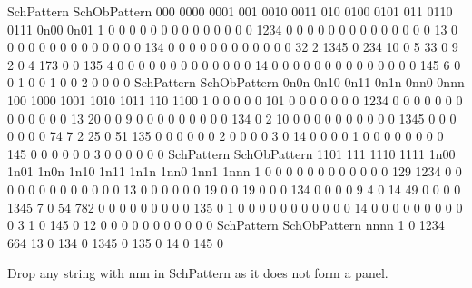 \begin{Schunk}
\begin{Soutput}
            SchPattern
SchObPattern 000 0000 0001 001 0010 0011 010 0100 0101 011 0110 0111 0n00 0n01
        1      0    0    0   0    0    0   0    0    0   0    0    0    0    0
        1234   0    0    0   0    0    0   0    0    0   0    0    0    0    0
        13     0    0    0   0    0    0   0    0    0   0    0    0    0    0
        134    0    0    0   0    0    0   0    0    0   0    0    0   32    2
        1345   0  234   10   0    5   33   0    9    2   0    4  173    0    0
        135    4    0    0   0    0    0   0    0    0   0    0    0    0    0
        14     0    0    0   0    0    0   0    0    0   0    0    0    0    0
        145    6    0    0   1    0    0   1    0    0   2    0    0    0    0
            SchPattern
SchObPattern 0n0n 0n10 0n11 0n1n 0nn0 0nnn 100 1000 1001 1010 1011 110 1100
        1       0    0    0    0    0  101   0    0    0    0    0   0    0
        1234    0    0    0    0    0    0   0    0    0    0    0   0    0
        13     20    0    0    9    0    0   0    0    0    0    0   0    0
        134     0    2   10    0    0    0   0    0    0    0    0   0    0
        1345    0    0    0    0    0    0   0   74    7    2   25   0   51
        135     0    0    0    0    0    0   2    0    0    0    0   3    0
        14      0    0    0    0    1    0   0    0    0    0    0   0    0
        145     0    0    0    0    0    0   3    0    0    0    0   0    0
            SchPattern
SchObPattern 1101 111 1110 1111 1n00 1n01 1n0n 1n10 1n11 1n1n 1nn0 1nn1 1nnn
        1       0   0    0    0    0    0    0    0    0    0    0    0  129
        1234    0   0    0    0    0    0    0    0    0    0    0    0    0
        13      0   0    0    0    0    0   19    0    0   19    0    0    0
        134     0   0    0    0    9    4    0   14   49    0    0    0    0
        1345    7   0   54  782    0    0    0    0    0    0    0    0    0
        135     0   1    0    0    0    0    0    0    0    0    0    0    0
        14      0   0    0    0    0    0    0    0    0    0    3    1    0
        145     0  12    0    0    0    0    0    0    0    0    0    0    0
            SchPattern
SchObPattern nnnn
        1       0
        1234  664
        13      0
        134     0
        1345    0
        135     0
        14      0
        145     0
\end{Soutput}
\end{Schunk}
Drop any string with \textsf{nnn} in \textsf{SchPattern} as it does not form a panel.

